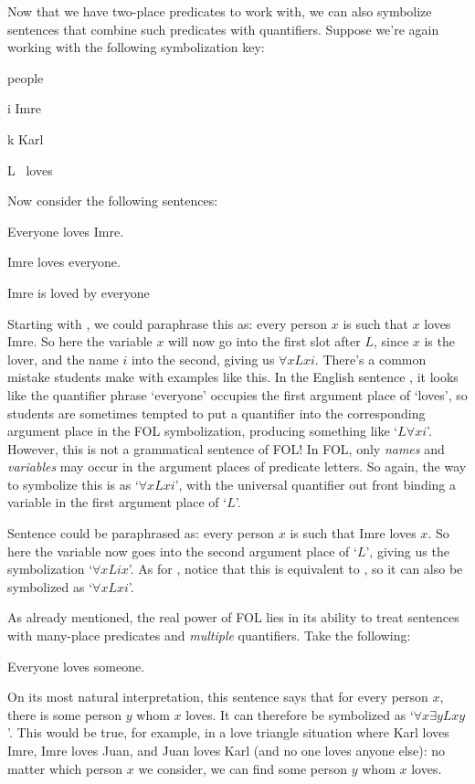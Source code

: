 Now that we have two-place predicates to work with, we can also symbolize sentences that combine such predicates with quantifiers.  Suppose we're again working with the following symbolization key:
	\begin{ekey}
		\item[\text{domain}] people
		\item[i] Imre
		\item[k] Karl
		\item[L] \blank\ loves \blank
	\end{ekey}
Now consider the following sentences:
	\begin{earg}
		\item[\ex{elovi}] Everyone loves Imre.
		\item[\ex{ilove}] Imre loves everyone.
		\item[\ex{ilovep}] Imre is loved by everyone
	\end{earg}
Starting with , we could paraphrase this as: every person $x$ is such that $x$ loves Imre.  So here the variable $x$ will now go into the first slot after $L$, since $x$ is the lover, and the name $i$ into the second, giving us $\forall xLxi$.  There's a common mistake students make with examples like this.  In the English sentence , it looks like the quantifier phrase `everyone'  occupies the first argument place of `loves', so students are sometimes tempted to put a quantifier into the corresponding argument place in the FOL symbolization, producing something like `$L\forall xi$'.  However, this is not a grammatical sentence of FOL!  In FOL, only \emph{names} and \emph{variables} may occur in the argument places of predicate letters.  So again, the way to symbolize this is as `$\forall xLxi$', with the universal quantifier out front binding a variable in the first argument place of `$L$'.

Sentence  could be paraphrased as: every person $x$ is such that Imre loves $x$.  So here the variable now goes into the second argument place of `$L$', giving us the symbolization `$\forall xLix$'.  As for , notice that this is equivalent to , so it can also be symbolized as `$\forall xLxi$'.

As already mentioned, the real power of FOL lies in its ability to treat sentences with many-place predicates and \emph{multiple} quantifiers.  Take the following:
	\begin{earg}
		\item[\ex{elovs}] Everyone loves someone.
	\end{earg}
On its most natural interpretation, this sentence says that for every person $x$, there is some person $y$ whom $x$ loves. It can therefore be symbolized as `$\forall x \exists yLxy$'.  This would be true, for example, in a love triangle situation where Karl loves Imre, Imre loves Juan, and Juan loves Karl (and no one loves anyone else): no matter which person  $x$ we consider, we can find some person $y$ whom $x$ loves.

